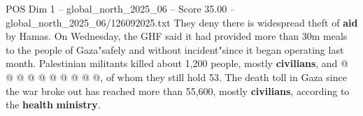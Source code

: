 \begin{textsample}{POS Dim 1 – global\_north\_2025\_06 – Score 35.00 – global\_north\_2025\_06/126092025.txt}
They deny there is widespread theft of \textbf{aid} by Hamas.
On Wednesday, the GHF said it had provided more than 30m meals to the people of Gaza"safely and without incident"since it began operating last month.
Palestinian militants killed about 1,200 people, mostly \textbf{civilians}, and @ @ @ @ @ @ @ @ @ @, of whom they still hold 53.
The death toll in Gaza since the war broke out has reached more than 55,600, mostly \textbf{civilians}, according to the \textbf{health} \textbf{ministry}.

\end{textsample}
